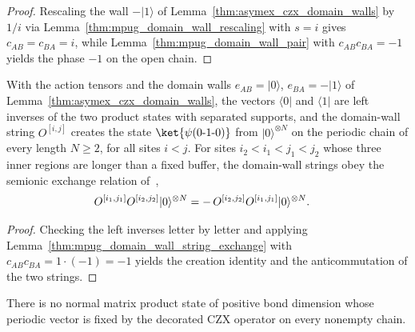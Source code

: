\begin{proof}
    \leanok
    Rescaling the wall $-|1\rangle$ of
    Lemma~\ref{thm:asymex_czx_domain_walls} by $1/i$ via
    Lemma~\ref{thm:mpug_domain_wall_rescaling} with $s=i$ gives
    $c_{AB}=c_{BA}=i$, while Lemma~\ref{thm:mpug_domain_wall_pair}
    with $c_{AB}c_{BA}=-1$ yields the phase $-1$ on the open chain.
\end{proof}

\begin{lemma}
    \label{thm:asymex_czx_string_exchange}
    \leanok
    With the action tensors and the domain walls $e_{AB}=|0\rangle$,
    $e_{BA}=-|1\rangle$ of Lemma~\ref{thm:asymex_czx_domain_walls}, the
    vectors $\langle0|$ and $\langle1|$ are left inverses of the two product
    states with separated supports, and the domain-wall string $O^{[i,j]}$
    creates the state $\ket{\psi(0\text{-}1\text{-}0)}$ from
    $|0\rangle^{\otimes N}$ on the periodic chain of every length $N\geq2$,
    for all sites $i<j$. For sites $i_2<i_1<j_1<j_2$ whose three inner
    regions are longer than a fixed buffer, the domain-wall strings obey
    the semionic exchange relation
    of~\cite[Section~III.F]{GarreRubioSchuch2024DomainWall},
    \begin{align}
        O^{[i_1,j_1]}O^{[i_2,j_2]}|0\rangle^{\otimes N}
         & =-\,O^{[i_2,j_2]}O^{[i_1,j_1]}|0\rangle^{\otimes N}.
        \notag
    \end{align}
\end{lemma}

\begin{proof}
    \leanok
    Checking the left inverses letter by letter and applying
    Lemma~\ref{thm:mpug_domain_wall_string_exchange} with
    $c_{AB}c_{BA}=1\cdot(-1)=-1$ yields the creation identity and the
    anticommutation of the two strings.
\end{proof}

\begin{corollary}
    \label{cor:asymex_czx_decorated_no_invariant}
    \leanok
    There is no normal matrix product state of positive bond dimension whose
    periodic vector is fixed by the decorated CZX operator on every nonempty
    chain.
\end{corollary}

